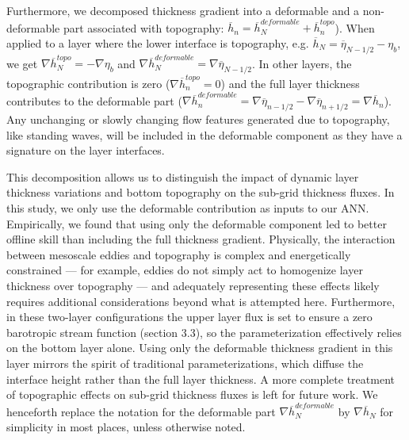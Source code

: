 \documentclass[draft]{agujournal2019}
\begin{document}
Furthermore, we decomposed thickness gradient into a deformable and a non-deformable part associated with topography: $ \overline{h}_n = \overline{h}_N^{deformable} +  \overline{h}_n^{topo}$). When applied to a layer where the lower interface is topography, e.g. $\overline{h}_N = \overline{\eta}_{N-1/2} - \eta_{b}$, we get $\nabla \overline{h}_N^{topo} = - \nabla \eta_{b}$ and $\nabla \overline{h}_N^{deformable} = \nabla \overline{\eta}_{N-1/2}$. In other layers, the topographic contribution is zero ($\nabla \overline{h}_n^{topo}=0$) and the full layer thickness contributes to the deformable part ($\nabla \overline{h}_n^{deformable} = \nabla \overline{\eta}_{n-1/2} - \nabla \overline{\eta}_{n+1/2} = \nabla \overline{h}_n$). Any unchanging or slowly changing flow features generated due to topography, like standing waves, will be included in the deformable component as they have a signature on the layer interfaces. 


This decomposition allows us to distinguish the impact of dynamic layer thickness variations and bottom topography on the sub-grid thickness fluxes. In this study, we only use the deformable contribution as inputs to our ANN. Empirically, we found that using only the deformable component led to better offline skill than including the full thickness gradient. 
Physically, the interaction between mesoscale eddies and topography is complex and energetically constrained --- for example, eddies do not simply act to homogenize layer thickness over topography \cite{adcock2000interactions} --- and adequately representing these effects likely requires additional considerations beyond what is attempted here. 
Furthermore, in these two-layer configurations the upper layer flux is set to ensure a zero barotropic stream function (section 3.3), so the parameterization effectively relies on the bottom layer alone. Using only the deformable thickness gradient in this layer mirrors the spirit of traditional parameterizations, which diffuse the interface height rather than the full layer thickness. A more complete treatment of topographic effects on sub-grid thickness fluxes is left for future work. We henceforth replace the notation for the deformable part $\nabla \overline{h}_N^{deformable}$ by $\nabla \overline{h}_N$ for simplicity in most places, unless otherwise noted.
\end{document}
